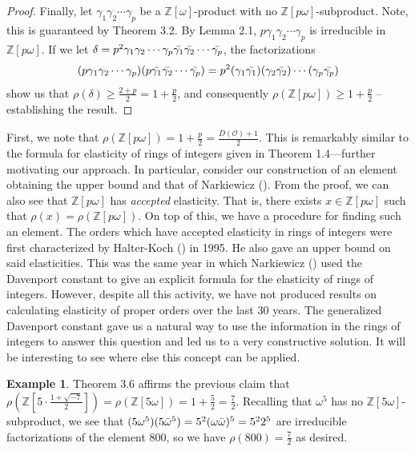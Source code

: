 \documentclass{amsart}
\theoremstyle{definition}
\newtheorem{ex}[lem]{Example}
\newcommand{\MO}{\mathcal{O}}
\newcommand{\bbz}{\mathbb{Z}}
\renewcommand{\geq}{\geqslant}
\numberwithin{equation}{section}
\begin{document}
\begin{proof}
    Finally, let $\gamma_1 \gamma_2 \dotsm \gamma_p$ be a $\bbz[\omega]$-product with no $\bbz[p\omega]$-subproduct. Note, this is guaranteed by Theorem 3.2. By Lemma 2.1, $p \gamma_1 \gamma_2 \dotsm \gamma_p$ is irreducible in $\bbz[p\omega]$. If we let $\delta = p^2 \gamma_1 \gamma_2 \dotsm \gamma_p \Bar{\gamma_1} \Bar{\gamma_2} \dotsm \Bar{\gamma_p}$, the factorizations   
    \[
    (p \gamma_1 \gamma_2 \dotsm \gamma_p)(p \Bar{\gamma_1} \Bar{\gamma_2} \dotsm \Bar{\gamma_p}) = p^2 (\gamma_1 \Bar{\gamma_1})(\gamma_2 \Bar{\gamma_2})\dotsm (\gamma_p \Bar{\gamma_p})
    \]
    show us that $\rho(\delta) \geq \frac{2 + p}{2} = 1 + \frac{p}{2}$, and consequently $\rho(\bbz[p\omega]) \geq 1 + \frac{p}{2}$ -- establishing the result. 
    
\end{proof}

First, we note that $\rho(\bbz[p\omega]) = 1 + \frac{p}{2} = \frac{\bar{D}(\MO)+1}{2}$. This is remarkably similar to the formula for elasticity of rings of integers given in Theorem 1.4---further motivating our approach. In particular, consider our construction of an element obtaining the upper bound and that of Narkiewicz (\cite{Narkiewicz1995Note}). From the proof, we can also see that $\bbz[p\omega]$ has \textit{accepted} elasticity. That is, there exists $x \in \bbz[p\omega]$ such that $\rho(x) = \rho(\bbz[p\omega])$. On top of this, we have a procedure for finding such an element. The orders which have accepted elasticity in rings of integers were first characterized by Halter-Koch (\cite{halter1995elasticity}) in 1995. He also gave an upper bound on said elasticities. This was the same year in which Narkiewicz (\cite{Narkiewicz1995Note}) used the Davenport constant to give an explicit formula for the elasticity of rings of integers. However, despite all this activity, we have not produced results on calculating elasticity of proper orders over the last 30 years. The generalized Davenport constant gave us a natural way to use the information in the rings of integers to answer this question and led us to a very constructive solution. It will be interesting to see where else this concept can be applied. 

\begin{ex}
    Theorem 3.6 affirms the previous claim that $\rho(\bbz[5 \cdot \frac{1 + \sqrt{-7}}{2}]) = \rho(\bbz[5\omega]) = 1 + \frac{5}{2} = \frac{7}{2}$. Recalling that $\omega^5$ has no $\bbz[5\omega]$-subproduct, we see that $(5\omega^5)(5 \Bar{\omega}^5) = 5^2(\omega \Bar{\omega})^5 = 5^2 2^5$ are irreducible factorizations of the element $800$, so we have $\rho(800) = \frac{7}{2}$ as desired. 
\end{ex}
\end{document}

